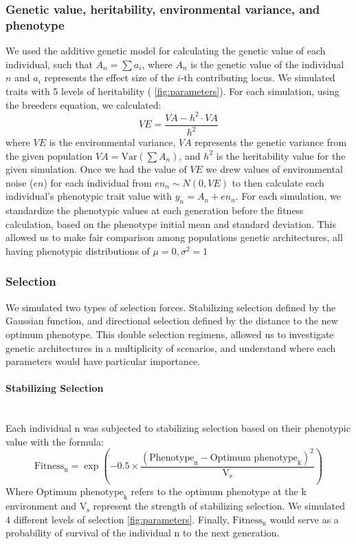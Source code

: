 \documentclass{article}
\let\oldparagraph\paragraph
\renewcommand{\paragraph}[1]{\oldparagraph{#1}\mbox{}\\}
\begin{document}
\subsubsection{Genetic value, heritability, environmental variance, and phenotype}

We used the additive genetic model for calculating the genetic value of each individual, such that $A_n=\sum a_i$, where $A_n$ is the genetic value of the individual $n$ and \( a_i \) represents the effect size of the \( i \)-th contributing locus. We simulated traits with 5 levels of heritability ( \ref{fig:parameters}). For each simulation, using the breeders equation, we calculated:
\[
VE = \frac{VA - h^2 \cdot VA}{h^2}
\]
where \( VE \) is the environmental variance, \( VA \) represents the genetic variance from the given population \( VA = \text{Var}\left(\sum A_n\right) \), and \( h^2 \) is the heritability value for the given simulation. Once we had the value of \( VE \) we drew values of environmental noise (\( en \)) for each individual from \( en_n \sim N(0, VE) \) to then calculate each individual's phenotypic trait value with \( y_n = A_n+ en_n \). For each simulation, we standardize the phenotypic values at each generation before the fitness calculation, based on the phenotype initial mean and standard deviation. This allowed us to make fair comparison among populations genetic architectures, all having phenotypic distributions of $\mu = 0, \sigma^2 = 1$

\subsubsection{Selection}
We simulated two types of selection forces. Stabilizing selection defined by the Gaussian function, and directional selection defined by the distance to the new optimum phenotype. This double selection regimens, allowed us to investigate genetic architectures in a multiplicity of scenarios, and understand where each parameters would have particular importance. 

\paragraph{Stabilizing Selection}
Each individual n was subjected to stabilizing selection based on their phenotypic value with the formula:
\[
\text{Fitness}_\text{n} = \exp\left(-0.5 \times \frac{(\text{Phenotype}_\text{n} - {\text{Optimum phenotype}_\text{k}})^2}{\text{V}_\text{s}}\right)
\]
Where $\text{Optimum phenotype}_\text{k}$ refers to the optimum phenotype at the k environment and $\text{V}_\text{s}$ represent the strength of stabilizing selection. We simulated 4 different levels of selection \ref{fig:parameters}. Finally,  $\text{Fitness}_\text{n}$ would serve as a probability of survival of the individual n to the next generation.
\end{document}
